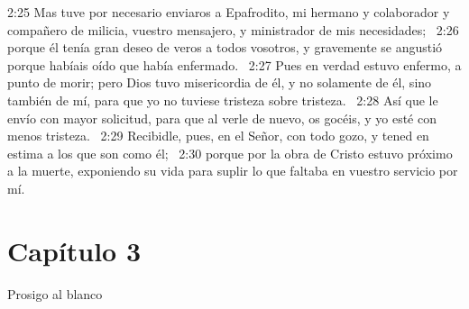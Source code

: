 2:25 Mas tuve por necesario enviaros a Epafrodito, mi hermano y colaborador y compañero de milicia, vuestro mensajero, y ministrador de mis necesidades;  
2:26 porque él tenía gran deseo de veros a todos vosotros, y gravemente se angustió porque habíais oído que había enfermado.  
2:27 Pues en verdad estuvo enfermo, a punto de morir; pero Dios tuvo misericordia de él, y no solamente de él, sino también de mí, para que yo no tuviese tristeza sobre tristeza.  
2:28 Así que le envío con mayor solicitud, para que al verle de nuevo, os gocéis, y yo esté con menos tristeza.  
2:29 Recibidle, pues, en el Señor, con todo gozo, y tened en estima a los que son como él;  
2:30 porque por la obra de Cristo estuvo próximo a la muerte, exponiendo su vida para suplir lo que faltaba en vuestro servicio por mí.  
\section*{Capítulo 3}
Prosigo al blanco  


